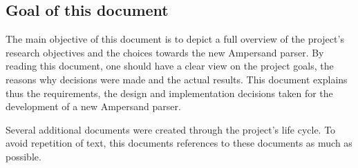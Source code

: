 
\subsection{Goal of this document}
The main objective of this document is to depict a full overview of the project's research objectives and the choices towards the new Ampersand parser.
By reading this document, one should have a clear view on the project goals, the reasons why decisions were made and the actual results.
This document explains thus the requirements, the design and implementation decisions taken for the development of a new Ampersand parser.

Several additional documents were created through the project's life cycle.
To avoid repetition of text, this documents references to these documents as much as possible.
